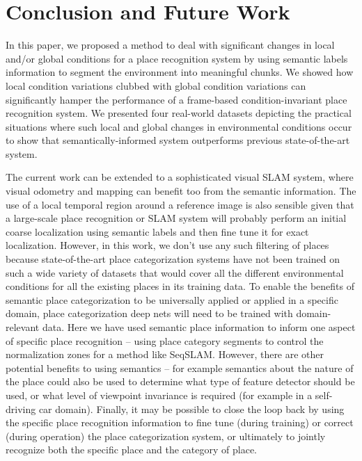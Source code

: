 \documentclass[letterpaper, 10 pt, conference]{ieeeconf}  %
\begin{document}
\section{Conclusion and Future Work}
In this paper, we proposed a method to deal with significant changes in local and/or global conditions for a place recognition system by using semantic labels information to segment the environment into meaningful chunks. We showed how local condition variations clubbed with global condition variations can significantly hamper the performance of a frame-based condition-invariant place recognition system. We presented four real-world datasets depicting the practical situations where such local and global changes in environmental conditions occur to show that semantically-informed system outperforms previous state-of-the-art system.

The current work can be extended to a sophisticated visual SLAM system, where visual odometry and mapping can benefit too from the semantic information. The use of a local temporal region around a reference image is also sensible given that a large-scale place recognition or SLAM system will probably perform an initial coarse localization using semantic labels and then fine tune it for exact localization. However, in this work, we don't use any such filtering of places because state-of-the-art place categorization systems have not been trained on such a wide variety of datasets that would cover all the different environmental conditions for all the existing places in its training data.
To enable the benefits of semantic place categorization to be universally applied or applied in a specific domain, place categorization deep nets will need to be trained with domain-relevant data.
Here we have used semantic place information to inform one aspect of specific place recognition – using place category segments to control the normalization zones for a method like SeqSLAM. However, there are other potential benefits to using semantics – for example semantics about the nature of the place could also be used to determine what type of feature detector should be used, or what level of viewpoint invariance is required (for example in a self-driving car domain). Finally, it may be possible to close the loop back by using the specific place recognition information to fine tune (during training) or correct (during operation) the place categorization system, or ultimately to jointly recognize both the specific place and the category of place.

\end{document}
